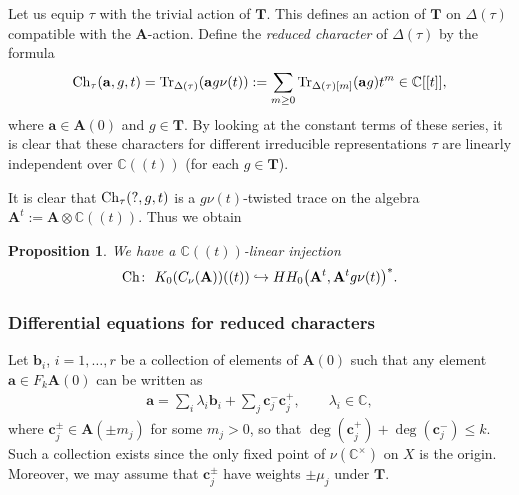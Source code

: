\documentclass[pdftex]{sigma}
\numberwithin{equation}{section}
\newtheorem{Proposition}[Theorem]{Proposition}
\begin{document}
Let us equip $\tau$ with the trivial action of ${\mathbf T}$. This defines an action of ${\mathbf T}$ on $\Delta(\tau)$ compatible with the ${\mathbf A}$-action. Define the {\it reduced character} of $\Delta(\tau)$ by the formula
\begin{gather*}
{\rm Ch}_\tau({\mathbf a},g,t)=\operatorname{Tr}_{\Delta(\tau)}({\mathbf a} g\nu(t)):=\sum_{m\ge 0}\operatorname{Tr}_{\Delta(\tau)[m]}({\mathbf a} g)t^m\in {\mathbb C}[[t]],
\end{gather*}
where ${\mathbf a}\in {\mathbf A}(0)$ and $g\in {\mathbf T}$. By looking at the constant terms of these series, it is clear that these characters for different irreducible representations $\tau$ are linearly independent over ${\mathbb C}((t))$ (for each $g\in {\mathbf T}$).

It is clear that ${\rm Ch}_\tau(?,g,t)$ is a $g\nu(t)$-twisted trace on the algebra ${\mathbf A}^t:={\mathbf A}\otimes {\mathbb C}((t))$. Thus we obtain

\begin{Proposition} We have a ${\mathbb C}((t))$-linear injection
\begin{gather*}
{\rm Ch}\colon \ K_0(C_\nu({\mathbf A}))((t))\hookrightarrow HH_0\big({\mathbf A}^t,{\mathbf A}^t g\nu(t)\big)^*.
\end{gather*}
\end{Proposition}

\subsubsection{Differential equations for reduced characters}

Let ${\mathbf b}_i$, $i=1,\dots,r$ be a collection of elements of ${\mathbf A}(0)$ such that
any element ${\mathbf a}\in F_k{\mathbf A}(0)$ can be written as
\begin{gather*}
{\mathbf a}=\sum_i \lambda_i{\mathbf b}_i+\sum_j {\mathbf c}_j^-{\mathbf c}_j^+, \qquad \lambda_i\in {\mathbb C},
\end{gather*}
where ${\mathbf c}_j^\pm\in {\mathbf A}(\pm m_j)$ for some $m_j>0$, so that $\deg({\mathbf c}_j^+)+\deg({\mathbf c}_j^-)\le k$. Such a collection exists since the only fixed point of $\nu({\mathbb C}^\times)$ on $X$ is the origin. Moreover, we may assume that ${\mathbf c}_j^\pm$ have weights
$\pm \mu_j$ under ${\mathbf T}$.
\end{document}
